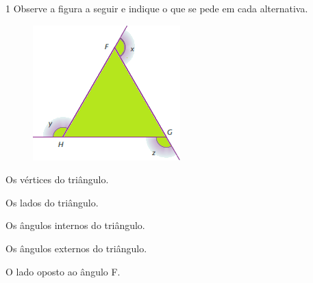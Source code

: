 \num{1} Observe a figura a seguir e indique o que se pede em cada alternativa.

\medskip

\begin{minipage}{.5\textwidth}
\begin{figure}[H]
\centering\includegraphics[width=\textwidth]{./imgSAEB_8_MAT/media/image13.png}
\end{figure}
\end{minipage}
\begin{minipage}{.5\textwidth}
\begin{escolha}[itemsep=0pt]
\item Os vértices do triângulo.
        
\item Os lados do triângulo.
        
\item Os ângulos internos do triângulo.
        
\item Os ângulos externos do triângulo.
        
\item O lado oposto ao ângulo F.
        
\end{escolha}
\end{minipage}

